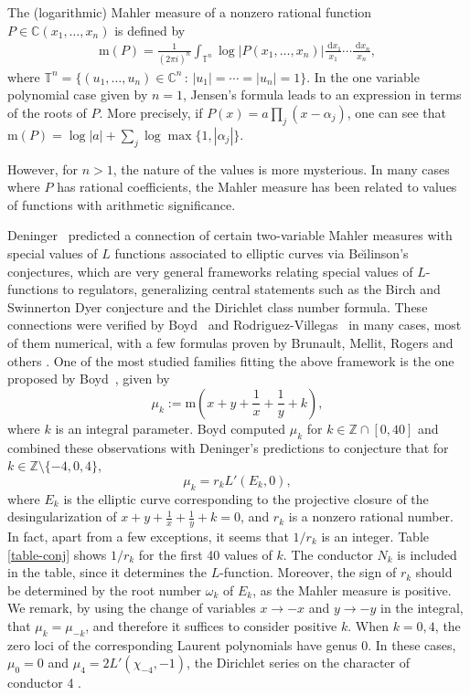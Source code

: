\documentclass[12pt]{amsart}%
\newcommand{\1}{\mathds{1}}
\newcommand{\C}{\mathbb{C}}
\newcommand{\Z}{\mathbb{Z}}
\newcommand{\dd}{\;\mathrm{d}}%
\theoremstyle{definition}
\numberwithin{equation}{section}
\numberwithin{table}{section}
\numberwithin{figure}{section}
\newcommand{\m}{\mathrm{m}}
\begin{document}
The (logarithmic) Mahler measure of a nonzero rational function $P\in \C(x_1,\dots,x_n)$ is defined by
\begin{align*}
\mathrm{m}(P)=\frac{1}{(2\pi i)^n}\int_{\mathbb{T}^n} \log\left| P(x_1,\dots,x_n)\right|\frac{\dd x_1}{x_1}\cdots \frac{\dd x_n}{x_n},
\end{align*}
where $\mathbb{T}^n=\{(u_1,\dots,u_n)\in \C^n\, : \, |u_1|=\cdots=|u_n|=1\}$.
In the one variable polynomial case given by  $n=1$, Jensen's formula leads to an expression in terms of the roots of $P$. More precisely, if $P(x)= a \prod_j(x-\alpha_j)$, one can see that $\m(P)=\log |a| + \sum_j \log\max\{1,|\alpha_j|\}$.


However, for $n>1$, the nature of the values is more mysterious. In many cases where $P$ has rational coefficients, the Mahler measure has been related to values of functions with arithmetic significance.

Deninger~\cite{Deninger} predicted a connection of certain two-variable Mahler measures with special values of $L$ functions associated to elliptic curves via Be\u\i linson's conjectures, which are very general frameworks relating special values of $L$-functions to regulators, generalizing central statements such as the Birch and Swinnerton Dyer conjecture and the Dirichlet class number formula. These connections were verified by Boyd~\cite{Bo98} and Rodriguez-Villegas~\cite{RV} in many cases, most of them numerical, with a few formulas proven by Brunault, Mellit, Rogers and others \cite{Br06,La10,LR07,Me12,RZ12,RZ14,Zu14}.
One of the most studied families fitting the above framework is the one proposed by Boyd~\cite{Bo98}, given by
\[\mu_k:=\mathrm{m}\left(x+y+\frac{1}{x}+\frac{1}{y}+k\right),\]
where $k$ is an integral parameter.  Boyd computed $\mu_k$ for $k\in\Z\cap [0,40]$ and combined these observations with Deninger's predictions to conjecture that for  $k\in \Z\setminus\{-4,0,4\}$,
\begin{equation}\label{eq:conjecture}
\mu_k=r_k L'(E_k,0),
\end{equation}
where $E_k$ is the elliptic curve corresponding to the projective closure of the desingularization of
$x+y+\frac{1}{x}+\frac{1}{y}+k=0$, and $r_k$ is a nonzero rational number. In fact, apart from a few exceptions, it seems that $1/r_k$ is an integer. Table \ref{table-conj} shows $1/r_k$ for the first 40 values of $k$. The conductor $N_k$ is included in the table, since it determines the $L$-function.%
Moreover, the sign of $r_k$ should be determined by the root number $\omega_k$ of $E_k$, as the Mahler measure is positive. We remark, by using the change of variables $x\rightarrow -x$ and $y \rightarrow -y$ in the integral, that $\mu_k=\mu_{-k}$, and therefore it suffices to consider positive $k$.%
When $k=0, 4$, the zero loci of the corresponding Laurent polynomials have genus 0. In these cases, $\mu_0=0$ and $\mu_4=2L'(\chi_{-4},-1)$, the Dirichlet series on the character of conductor 4 \cite{Bo98}.
\end{document}
